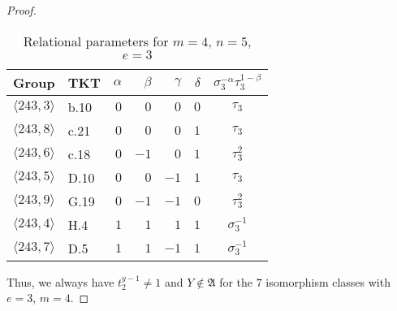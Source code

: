 \documentclass{amsart}
\theoremstyle{definition}
\numberwithin{equation}{section}
\begin{document}
\begin{proof}
\begin{table}[ht]
\caption{Relational parameters for \(m=4\), \(n=5\), \(e=3\)}
\label{tbl:SmlBicExpY}
\begin{center}
\begin{tabular}{|c|l|rrrr|c|}
\hline
 Group                    & TKT   & \(\alpha\) & \(\beta\) & \(\gamma\) & \(\delta\) & \(\sigma_3^{-\alpha}\tau_3^{1-\beta}\) \\
\hline
 \(\langle 243,3\rangle\) &  b.10 &      \(0\) &     \(0\) &      \(0\) &      \(0\) &                             \(\tau_3\) \\
 \(\langle 243,8\rangle\) &  c.21 &      \(0\) &     \(0\) &      \(0\) &      \(1\) &                             \(\tau_3\) \\
 \(\langle 243,6\rangle\) &  c.18 &      \(0\) &    \(-1\) &      \(0\) &      \(1\) &                           \(\tau_3^2\) \\
 \(\langle 243,5\rangle\) &  D.10 &      \(0\) &     \(0\) &     \(-1\) &      \(1\) &                             \(\tau_3\) \\
 \(\langle 243,9\rangle\) &  G.19 &      \(0\) &    \(-1\) &     \(-1\) &      \(0\) &                           \(\tau_3^2\) \\
 \(\langle 243,4\rangle\) &  H.4  &      \(1\) &     \(1\) &      \(1\) &      \(1\) &                      \(\sigma_3^{-1}\) \\
 \(\langle 243,7\rangle\) &  D.5  &      \(1\) &     \(1\) &     \(-1\) &      \(1\) &                      \(\sigma_3^{-1}\) \\
\hline
\end{tabular}
\end{center}
\end{table}

\smallskip
\noindent
Thus, we always have \(t_2^{y-1}\ne 1\) and \(Y\notin\mathfrak{A}\)
for the \(7\) isomorphism classes with \(e=3\), \(m=4\).


\end{proof}
\end{document}
